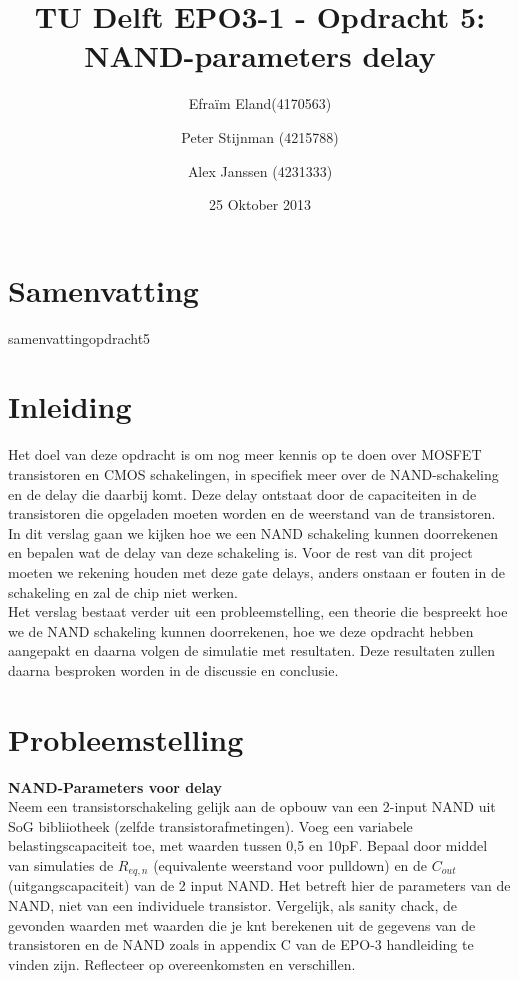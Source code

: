 \documentclass{article}
\author{
Efraïm Eland(4170563) \and Peter Stijnman (4215788) \and Alex Janssen (4231333) \\
}
\title{TU Delft EPO3-1 - Opdracht 5: NAND-parameters delay}
\date{25 Oktober 2013}
\begin{document}
\maketitle

\section{Samenvatting}

{samenvattingopdracht5}

\tableofcontents
\clearpage

\section{Inleiding}

Het doel van deze opdracht is om nog meer kennis op te doen over MOSFET transistoren en CMOS schakelingen, in specifiek  meer over de NAND-schakeling en de delay die daarbij komt. Deze delay ontstaat door de capaciteiten in de transistoren die opgeladen moeten worden en de weerstand van de transistoren. In dit verslag gaan we kijken hoe we een NAND schakeling kunnen doorrekenen en bepalen wat de delay van deze schakeling is. Voor de rest van dit project moeten we rekening houden met deze gate delays, anders onstaan er fouten in de schakeling en zal de chip niet werken.\\
Het verslag bestaat verder uit een probleemstelling, een theorie die bespreekt hoe we de NAND schakeling kunnen doorrekenen, hoe we deze opdracht hebben aangepakt en daarna volgen de simulatie met resultaten. Deze resultaten zullen daarna besproken worden in de discussie en conclusie.

\section{Probleemstelling}
\textbf {NAND-Parameters voor delay}\\

Neem een transistorschakeling gelijk aan de opbouw van een 2-input NAND uit SoG bibliiotheek (zelfde transistorafmetingen).
Voeg een variabele belastingscapaciteit toe, met waarden tussen 0,5 en 10pF. Bepaal door middel van simulaties de  $R_{eq,n}$ (equivalente weerstand voor pulldown) en de $C_{out}$ (uitgangscapaciteit) van de 2 input NAND. Het betreft hier de parameters van de NAND, niet van een individuele transistor. Vergelijk, als sanity chack, de gevonden waarden met waarden die je knt berekenen uit de gegevens van de transistoren en de NAND zoals in appendix C van de EPO-3 handleiding te vinden zijn. Reflecteer op overeenkomsten en verschillen.
\end{document}
